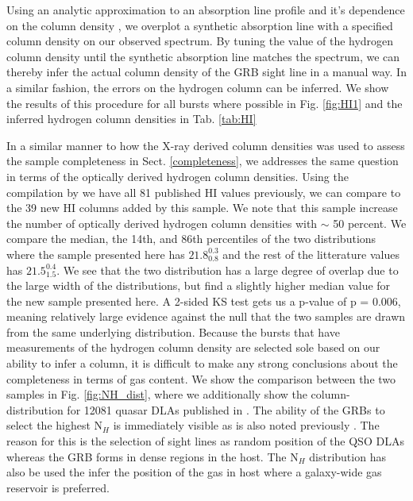 \documentclass{aa}    %
\begin{document}
Using an analytic approximation to an absorption line profile and it's
dependence on the column density \citep{TepperGarcia2006}, we overplot a
synthetic absorption line with a specified column density on our observed
spectrum. By tuning the value of the hydrogen column density until the synthetic
absorption line matches the spectrum, we can thereby infer the actual column
density of the GRB sight line in a manual way. In a similar fashion, the errors
on the hydrogen column can be inferred. We show the results of this procedure
for all bursts where possible in Fig. \ref{fig:HI1} and the inferred hydrogen
column densities in Tab. \ref{tab:HI}



In a similar manner to how the X-ray derived column densities was used to assess
the sample completeness in Sect. \ref{completeness}, we addresses the same
question in terms of the optically derived hydrogen column densities. Using the
compilation by \citet{Tanvir2017} we have all 81 published HI values previously,
we can compare to the 39 new HI columns added by this sample. We note that this
sample increase the number of optically derived hydrogen column densities with
$\sim$ 50 percent. We compare the median, the 14th, and 86th percentiles of the
two distributions where the sample presented here has $21.8_{0.8}^{0.3}$ and the
rest of the litterature values has $21.5_{1.5}^{0.4}$. We see that the two
distribution has a large degree of overlap due to the large width of the
distributions, but find a slightly higher median value for the new sample
presented here. A 2-sided KS test gets us a p-value of p = 0.006, meaning
relatively large evidence against the null that the two samples are drawn from
the same underlying distribution. Because the bursts that have measurements of
the hydrogen column density are selected sole based on our ability to infer a
column, it is difficult to make any strong conclusions about the completeness in
terms of gas content. We show the comparison between the two samples in Fig.
\ref{fig:NH_dist}, where we additionally show the column-distribution for 12081
quasar DLAs published in \citet{Noterdaeme2012b}. The ability of the GRBs to
select the highest N$_H$ is immediately visible as is also noted previously
\citep{Prochaska2007, Fynbo2009}. The reason for this is the selection of sight
lines as random position of the QSO DLAs whereas the GRB forms in dense regions
in the host. The N$_H$ distribution has also be used the infer the position of
the gas in host \cite{Buchner2016} where a galaxy-wide gas reservoir is
preferred.
\end{document}
